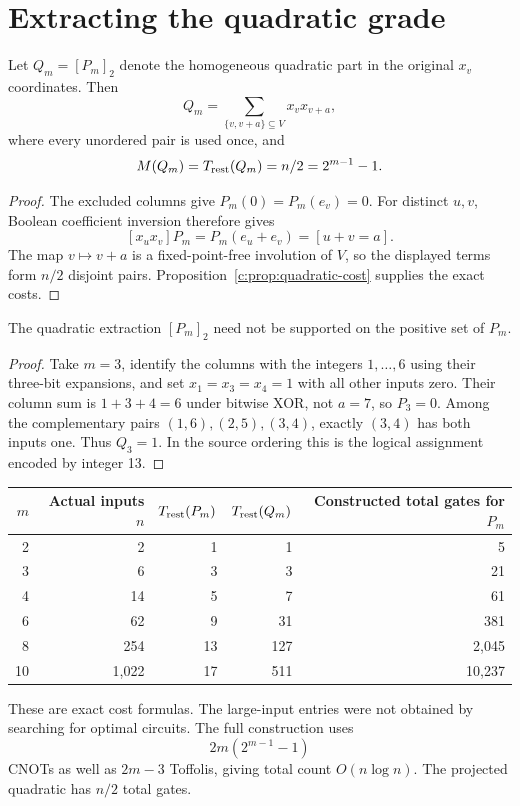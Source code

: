 \section{Extracting the quadratic grade}
\begin{theorem}\label{c:thm:grade-cost}
Let $Q_m=[P_m]_2$ denote the homogeneous quadratic part in the original $x_v$ coordinates. Then
\[
 Q_m=\sum_{\{v,v+a\}\subseteq V}x_vx_{v+a},
\]
where every unordered pair is used once, and
\[
 M(Q_m)=T_{\mathrm{rest}}(Q_m)=n/2=2^{m-1}-1.
\]
\end{theorem}
\begin{proof}
The excluded columns give $P_m(0)=P_m(e_v)=0$. For distinct $u,v$, Boolean coefficient inversion therefore gives
\[
 [x_ux_v]P_m=P_m(e_u+e_v)=[u+v=a].
\]
The map $v\mapsto v+a$ is a fixed-point-free involution of $V$, so the displayed terms form $n/2$ disjoint pairs. Proposition~\ref{c:prop:quadratic-cost} supplies the exact costs.
\end{proof}

\begin{counterexample}\label{c:ce:unsafe}
The quadratic extraction $[P_m]_2$ need not be supported on the positive set of $P_m$.
\end{counterexample}
\begin{proof}
Take $m=3$, identify the columns with the integers $1,\ldots,6$ using their three-bit expansions, and set $x_1=x_3=x_4=1$ with all other inputs zero. Their column sum is $1+3+4=6$ under bitwise XOR, not $a=7$, so $P_3=0$. Among the complementary pairs $(1,6),(2,5),(3,4)$, exactly $(3,4)$ has both inputs one. Thus $Q_3=1$. In the source ordering this is the logical assignment encoded by integer 13.
\end{proof}

\begin{center}
\begin{tabular}{@{}rrrrr@{}}
\toprule
$m$ & Actual inputs $n$ & $T_{\mathrm{rest}}(P_m)$ & $T_{\mathrm{rest}}(Q_m)$ & Constructed total gates for $P_m$\\\midrule
2 & 2 & 1 & 1 & 5\\
3 & 6 & 3 & 3 & 21\\
4 & 14 & 5 & 7 & 61\\
6 & 62 & 9 & 31 & 381\\
8 & 254 & 13 & 127 & 2,045\\
10 & 1,022 & 17 & 511 & 10,237\\
\bottomrule
\end{tabular}
\end{center}
These are exact cost formulas. The large-input entries were not obtained by searching for optimal circuits. The full construction uses
\[
 2m(2^{m-1}-1)
\]
CNOTs as well as $2m-3$ Toffolis, giving total count $O(n\log n)$. The projected quadratic has $n/2$ total gates.

